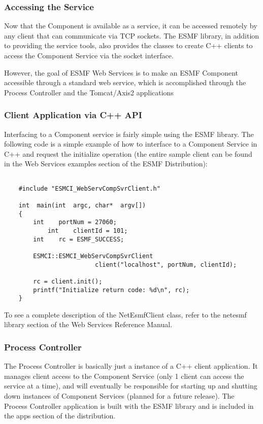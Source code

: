 \subsubsection{Accessing the Service}
Now that the Component is available as a service, it can be accessed remotely by any client 
that can communicate via TCP sockets.  The ESMF library, in addition to providing the 
service tools, also provides the classes to create C++ clients to access the Component 
Service via the socket interface.

However, the goal of ESMF Web Services is to make an ESMF Component accessible through 
a standard web service, which is accomplished through the Process Controller and the 
Tomcat/Axis2 applications

\subsubsection{Client Application via C++ API}

Interfacing to a Component service is fairly simple using the ESMF library.  The following 
code is a simple example of how to interface to a Component Service in C++ and request 
the initialize operation (the entire sample client can be found in the Web Services examples 
section of the ESMF Distribution):

\begin{verbatim}

	#include "ESMCI_WebServCompSvrClient.h"

	int  main(int  argc, char*  argv[])
	{
   	    int    portNum = 27060;
      	    int    clientId = 101;
   	    int    rc = ESMF_SUCCESS;

   	    ESMCI::ESMCI_WebServCompSvrClient   
                         client("localhost", portNum, clientId);

   	    rc = client.init();
   	    printf("Initialize return code: %d\n", rc);
	}

\end{verbatim}


To see a complete description of the NetEsmfClient class, refer to the netesmf library 
section of the Web Services Reference Manual.

\subsubsection{Process Controller}

The Process Controller is basically just a instance of a C++ client application. It manages 
client access to the Component Service (only 1 client can access the service at a time), 
and will eventually be responsible for starting up and shutting down instances of 
Component Services (planned for a future release). The Process Controller application is 
built with the ESMF library and is included in the apps section of the distribution.

